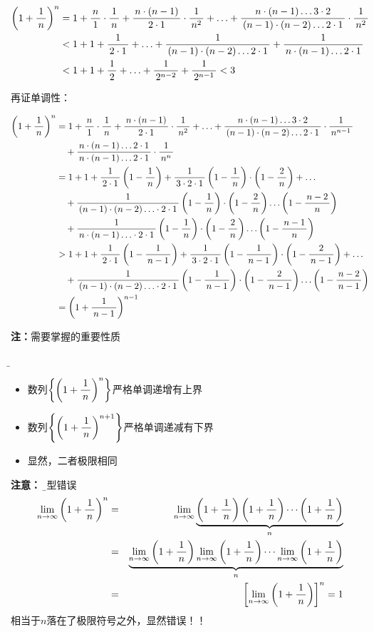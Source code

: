 \begin{align}
	\left(1+\df1n\right)^n&=1+\df n1\cdot\df1n
	+\df{n\cdot(n-1)}{2\cdot1}\cdot\df1{n^2}+\ldots
	+\df{n\cdot(n-1)\ldots3\cdot2}{(n-1)\cdot(n-2)\ldots2\cdot1}\cdot\df1{n^2}\notag\\
	&<1+1+\df1{2\cdot1}+\ldots+\df1{(n-1)\cdot(n-2)\ldots2\cdot1}
	+\df1{n\cdot(n-1)\ldots2\cdot1}\notag\\
	&<1+1+\df12+\ldots+\df1{2^{n-2}}+\df1{2^{n-1}}<3\notag
\end{align}

再证单调性：

\begin{align}
	\left(1+\df1n\right)^n&=1+\df n1\cdot\df1n
	+\df{n\cdot(n-1)}{2\cdot1}\cdot\df1{n^2}+\ldots
	+\df{n\cdot(n-1)\ldots3\cdot2}{(n-1)\cdot(n-2)\ldots2\cdot1}
	\cdot\df1{n^{n-1}}\notag\\
	&\quad +\df{n\cdot(n-1)\ldots2\cdot1}{n\cdot(n-1)\ldots2\cdot1}
	\cdot\df1{n^{n}}\notag\\
	&=1+1+\df1{2\cdot 1}\left(1-\df1n\right)+\df1{3\cdot2\cdot
	1}\left(1-\df1n\right)\cdot\left(1-\df2n\right)+\ldots\notag\\
	&\quad +\df1{(n-1)\cdot(n-2)\ldots\cdot2\cdot
	1}\left(1-\df1n\right)\cdot\left(1-\df2n\right)
	\ldots\left(1-\df{n-2}n\right)\notag\\
	&\quad +\df1{n\cdot (n-1)\ldots\cdot2\cdot
	1}\left(1-\df1n\right)\cdot\left(1-\df2n\right)
	\ldots\left(1-\df{n-1}n\right)\notag\\
	&>1+1+\df1{2\cdot 1}\left(1-\df1{n-1}\right)+\df1{3\cdot2\cdot
	1}\left(1-\df1{n-1}\right)\cdot\left(1-\df2{n-1}\right)+\ldots\notag\\
	&\quad +\df1{(n-1)\cdot(n-2)\ldots\cdot2\cdot
	1}\left(1-\df1{n-1}\right)\cdot\left(1-\df2{n-1}\right)
	\ldots\left(1-\df{n-2}{n-1}\right)\notag\\
	&=\left(1+\df1{n-1}\right)^{n-1}\notag
\end{align}

{\bf 注：}需要掌握的重要性质{\b
\begin{itemize}
  \setlength{\itemindent}{1cm}
  \item 数列$\left\{\left(1+\df 1n\right)^n\right\}$严格单调递增有上界
  \item 数列$\left\{\left(1+\df 1n\right)^{n+1}\right\}$严格单调递减有下界
  \item 显然，二者极限相同
\end{itemize}}

{\bf 注意：}
{\b 典型错误
\begin{eqnarray*}
	\limn\left(1+\df1n\right)^n&
	=&\limn \underbrace{\left(1+\df 1n\right)\left(1+\df 1n\right)\cdots
	\left(1+\df	1n\right)}_{n}\\
	&=&\underbrace{\limn\left(1+\df1n\right)\limn\left(1+\df1n\right)
	\cdots\limn\left(1+\df1n\right)}_{n}\\
	&=&\left[\limn\left(1+\df1n\right)\right]^n=1
\end{eqnarray*}}
相当于$n$落在了极限符号之外，显然错误！！


